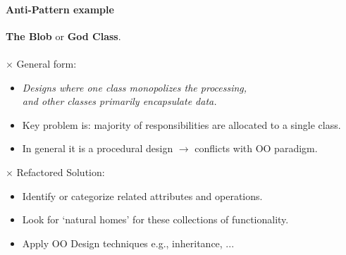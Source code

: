 \documentclass[a4paper,11pt]{report}
\begin{document}
		\paragraph{Anti-Pattern example} 
			\textbf{The Blob} or
			\textbf{God Class}.\\~\\
		$\times$ General form:
		\begin{itemize}
			\setlength{\itemsep}{0pt}
			\setlength{\parskip}{0pt}
			\setlength{\parsep}{0pt}
			\item \textit{Designs where one class
				monopolizes the processing,\\ and other
				classes primarily encapsulate data.}
			\item Key problem is: majority of
				responsibilities are allocated to a 
				single class.
			\item In general it is a procedural design
				$\longrightarrow$ conflicts with OO
				paradigm.
		\end{itemize}
		$\times$ Refactored Solution:
		\begin{itemize}
			\setlength{\itemsep}{0pt}
			\setlength{\parskip}{0pt}
			\setlength{\parsep}{0pt}
			\item Identify or categorize related 
				attributes and operations.
			\item Look for ‘natural homes’ for these
				collections of functionality.
			\item Apply OO Design techniques
				e.g., inheritance, ...
		\end{itemize}
\end{document}
